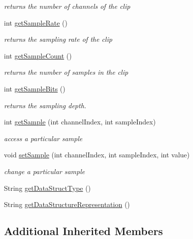 \begin{DoxyCompactItemize}
\begin{DoxyCompactList}\small\item\em returns the number of channels of the clip \end{DoxyCompactList}\item 
int \hyperlink{classbridges_1_1base_1_1_audio_clip_a610df43929946a6186e6739e361916eb}{get\+Sample\+Rate} ()
\begin{DoxyCompactList}\small\item\em returns the sampling rate of the clip \end{DoxyCompactList}\item 
int \hyperlink{classbridges_1_1base_1_1_audio_clip_a8ad739b7a085787028b4278d65b1b3f4}{get\+Sample\+Count} ()
\begin{DoxyCompactList}\small\item\em returns the number of samples in the clip \end{DoxyCompactList}\item 
int \hyperlink{classbridges_1_1base_1_1_audio_clip_a59e5a3f38768e52c15e43b5679f3f09c}{get\+Sample\+Bits} ()
\begin{DoxyCompactList}\small\item\em returns the sampling depth. \end{DoxyCompactList}\item 
int \hyperlink{classbridges_1_1base_1_1_audio_clip_a0db520ed7ad301161e03a55b783856f8}{get\+Sample} (int channel\+Index, int sample\+Index)
\begin{DoxyCompactList}\small\item\em access a particular sample \end{DoxyCompactList}\item 
void \hyperlink{classbridges_1_1base_1_1_audio_clip_a896e82f2788b319569c4f0e8f919ffc9}{set\+Sample} (int channel\+Index, int sample\+Index, int value)
\begin{DoxyCompactList}\small\item\em change a particular sample \end{DoxyCompactList}\item 
String \hyperlink{classbridges_1_1base_1_1_audio_clip_ad1941b14198946a14d218d7be47f94b5}{get\+Data\+Struct\+Type} ()
\item 
String \hyperlink{classbridges_1_1base_1_1_audio_clip_a8ed51c9a938b94d11f274d663a0c9fd4}{get\+Data\+Structure\+Representation} ()
\end{DoxyCompactItemize}
\subsection*{Additional Inherited Members}


